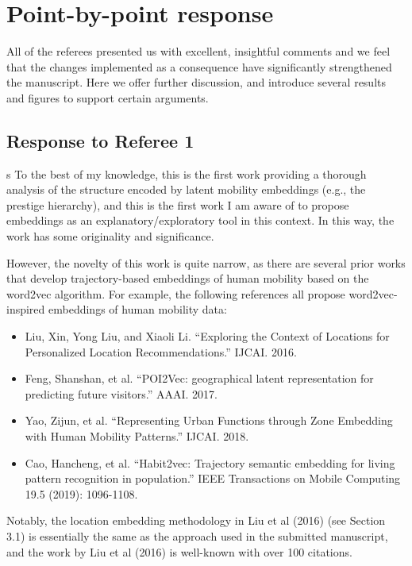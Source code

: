 \documentclass[12pt,draft,a4paper]{article}
\newcounter{comment}[subsection]
\newcommand{\rcomment}[1]{%
\vspace{10pt}
\begin{sectionbox}
s #1
\end{sectionbox}
}
\begin{document}
%
%
\clearpage
\section{Point-by-point response}
All of the referees presented us with excellent, insightful comments and we feel that the changes implemented as a consequence have signiﬁcantly strengthened the manuscript. Here we offer further discussion, and introduce several results and figures to support certain arguments.
\subsection{Response to Referee 1}
\setcounter{section}{1}


\rcomment{%
	To the best of my knowledge, this is the first work providing a thorough analysis of the structure encoded by latent mobility embeddings (e.g., the prestige hierarchy), and this is the first work I am aware of to propose embeddings as an explanatory/exploratory tool in this context. In this way, the work has some originality and significance.

	However, the novelty of this work is quite narrow, as there are several prior works that develop trajectory-based embeddings of human mobility based on the word2vec algorithm. For example, the following references all propose word2vec-inspired embeddings of human mobility data:

	\begin{itemize}
		\item Liu, Xin, Yong Liu, and Xiaoli Li. ``Exploring the Context of Locations for Personalized Location Recommendations.'' IJCAI. 2016.
		\item Feng, Shanshan, et al. ``POI2Vec: geographical latent representation for predicting future visitors.'' AAAI. 2017.
		\item Yao, Zijun, et al. ``Representing Urban Functions through Zone Embedding with Human Mobility Patterns.'' IJCAI. 2018.
		\item Cao, Hancheng, et al. ``Habit2vec: Trajectory semantic embedding for living pattern recognition in population.'' IEEE Transactions on Mobile Computing 19.5 (2019): 1096-1108.
	\end{itemize}

	Notably, the location embedding methodology in Liu et al (2016) (see Section 3.1) is essentially the same as the approach used in the submitted manuscript, and the work by Liu et al (2016) is well-known with over 100 citations.
}
\end{document}
